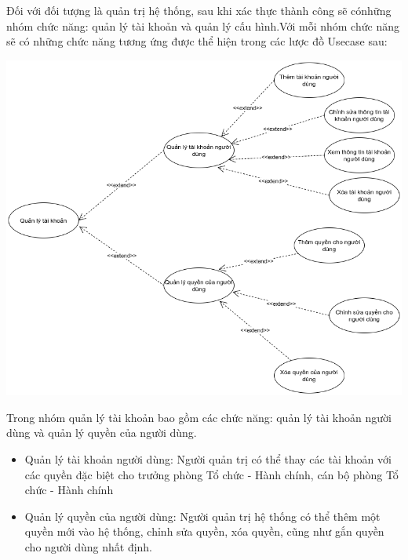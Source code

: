 \indent Đối với đối tượng là quản trị hệ thống, sau khi xác thực thành công sẽ cónhững nhóm chức năng: quản lý tài khoản và quản lý cấu hình.Với mỗi nhóm chức năng sẽ có những chức năng tương ứng được thể hiện trong các lược đồ Usecase sau:

\begin{center}
  \captionsetup{type=figure}
  \includegraphics[scale=0.5]{img/UML/Admin/quanlytaikhoan.png}
\end{center}

Trong nhóm quản lý tài khoản bao gồm các chức năng: quản lý tài khoản người dùng và quản lý quyền của người dùng.
\begin{itemize}
    \item Quản lý tài khoản người dùng:
        \subitem Người quản trị có thể thay các tài khoản với các quyền đặc biệt cho trưởng phòng Tổ chức - Hành chính, cán bộ phòng Tổ chức - Hành chính
    \item Quản lý quyền của người dùng:
        \subitem Người quản trị hệ thống có thể thêm một quyền mới vào hệ thống, chỉnh sửa quyền, xóa quyền, cũng như gắn quyền cho người dùng nhất định.
\end{itemize}


